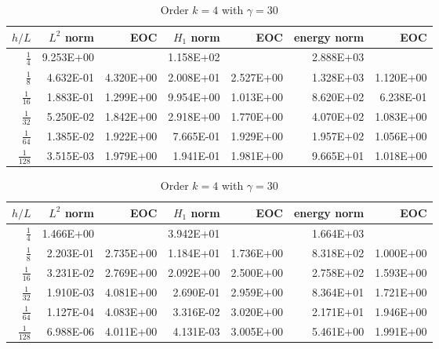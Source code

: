 \begin{table}
  \caption{\label{tab:ex1_order2}  Order $k=2$ with $ \gamma = 9$.}
  \begin{tabular}{rrrrrrr}
    \hline\hline
    \textbf{$h/{L} $} & \textbf{$L^2$ norm} & \textbf{EOC} & \textbf{$H_1$ norm} & \textbf{EOC} & \textbf{energy norm} & \textbf{EOC} \\\hline
    $\frac{1}{4}$ & 9.253E+00 &  & 1.158E+02 &  & 2.888E+03 &  \\
    $\frac{1}{8}$ & 4.632E-01 & 4.320E+00 & 2.008E+01 & 2.527E+00 & 1.328E+03 & 1.120E+00 \\
    $\frac{1}{16}$ & 1.883E-01 & 1.299E+00 & 9.954E+00 & 1.013E+00 & 8.620E+02 & 6.238E-01 \\
    $\frac{1}{32}$ & 5.250E-02 & 1.842E+00 & 2.918E+00 & 1.770E+00 & 4.070E+02 & 1.083E+00 \\
    $\frac{1}{64}$ & 1.385E-02 & 1.922E+00 & 7.665E-01 & 1.929E+00 & 1.957E+02 & 1.056E+00 \\
    $\frac{1}{128}$ & 3.515E-03 & 1.979E+00 & 1.941E-01 & 1.981E+00 & 9.665E+01 & 1.018E+00 \\\hline\hline
  \end{tabular}
  \caption{\label{tab:ex1_order3} Order $k=3$ with $ \gamma = 18$}
  \begin{tabular}{rrrrrrr}
    \hline\hline
    \textbf{$h/{L} $} & \textbf{$L^2$ norm} & \textbf{EOC} & \textbf{$H_1$ norm} & \textbf{EOC} & \textbf{energy norm} & \textbf{EOC} \\\hline
    $\frac{1}{4}$ & 1.466E+00 &  & 3.942E+01 &  & 1.664E+03 &  \\
    $\frac{1}{8}$ & 2.203E-01 & 2.735E+00 & 1.184E+01 & 1.736E+00 & 8.318E+02 & 1.000E+00 \\
    $\frac{1}{16}$ & 3.231E-02 & 2.769E+00 & 2.092E+00 & 2.500E+00 & 2.758E+02 & 1.593E+00 \\
    $\frac{1}{32}$ & 1.910E-03 & 4.081E+00 & 2.690E-01 & 2.959E+00 & 8.364E+01 & 1.721E+00 \\
    $\frac{1}{64}$ & 1.127E-04 & 4.083E+00 & 3.316E-02 & 3.020E+00 & 2.171E+01 & 1.946E+00 \\
    $\frac{1}{128}$ & 6.988E-06 & 4.011E+00 & 4.131E-03 & 3.005E+00 & 5.461E+00 & 1.991E+00 \\\hline\hline
  \end{tabular}
  \caption{\label{tab:ex1_order4}Order $k=4$ with $ \gamma = 30$}

\end{table}
